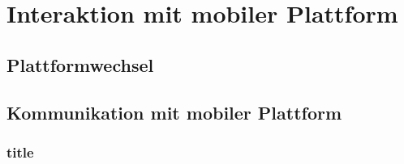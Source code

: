\chapter{Interaktion mit mobiler Plattform}
	\section{Plattformwechsel}
	\section{Kommunikation mit mobiler Plattform}
		\subsection{title}
